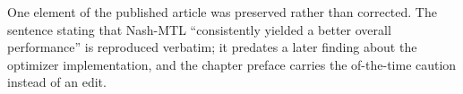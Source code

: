 One element of the published article was preserved rather than
corrected. The sentence stating that Nash-MTL ``consistently yielded a better
overall performance'' is reproduced verbatim; it predates a later finding about the
optimizer implementation, and the chapter preface carries the of-the-time caution
instead of an edit.

